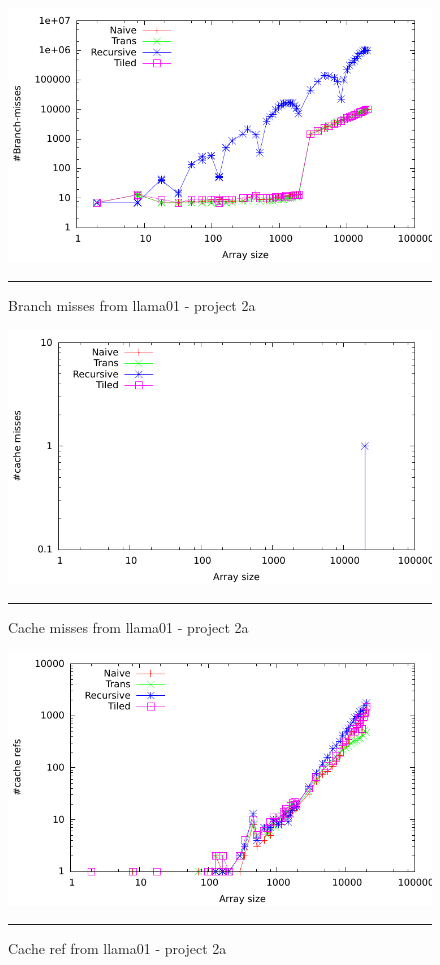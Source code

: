 \begin{figure}[ht]
	\centering
		\includegraphics[width=\textwidth]{./Appendices/Figures/Project2a/Branch_misses_putty.pdf}
		\rule{35em}{0.5pt}
	\caption*{
	Branch misses from llama01 - project 2a
	}
	\label{fig:Branch_misses_p2putty}
\end{figure}
\begin{figure}[ht]
	\centering
		\includegraphics[width=\textwidth]{./Appendices/Figures/Project2a/Cache_misses_putty.pdf}
		\rule{35em}{0.5pt}
	\caption*{
	Cache misses from llama01 - project 2a
	}
	\label{fig:Cache_misses_p2putty}
\end{figure}
\begin{figure}[ht]
	\centering
		\includegraphics[width=\textwidth]{./Appendices/Figures/Project2a/Cache_refs_putty.pdf}
		\rule{35em}{0.5pt}
	\caption*{
	Cache ref from llama01 - project 2a
	}
	\label{fig:Cache_refs_p2putty}
\end{figure}

